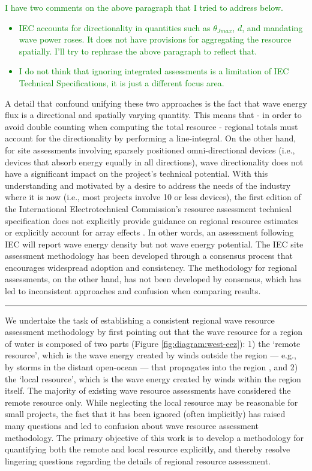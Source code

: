\textcolor{green}{I have two comments on the above paragraph that I tried to address below.
\begin{itemize}
    \item IEC accounts for directionality in quantities such as $\theta_{Jmax}$, $d$, and mandating wave power roses. It does not have provisions for aggregating the resource spatially. I'll try to rephrase the above paragraph to reflect that.
    \item I do not think that ignoring integrated assessments is a limitation of IEC Technical Specifications, it is just a different focus area. 
\end{itemize}}

A detail that confound unifying these two approaches is the fact that wave energy flux is a directional and spatially varying quantity. This means that - in order to avoid double counting when computing the total resource - regional totals must account for the directionality by performing a line-integral. On the other hand, for site assessments involving sparsely positioned omni-directional devices (i.e., devices that absorb energy equally in all directions), wave directionality does not have a significant impact on the project’s technical potential. With this understanding and motivated by a desire to address the needs of the industry where it is now (i.e., most projects involve 10 or less devices), the first edition of the International Electrotechnical Commission’s resource assessment technical specification does not explicitly provide guidance on regional resource estimates or explicitly account for array effects \citep[]{internationalelectrotechnicalcommissionPart101Wave2015}. In other words, an assessment following IEC will report wave energy density but not wave energy potential. The IEC site assessment methodology has been developed through a consensus process that encourages widespread adoption and consistency. The methodology for regional assessments, on the other hand, has not been developed by consensus, which has led to inconsistent approaches and confusion when comparing results.

\noindent\rule{12cm}{0.4pt}

We undertake the task of establishing a consistent regional wave
resource assessment methodology by first pointing out that the wave
resource for a region of water is composed of two parts (Figure
\ref{fig:diagram:west-eez}): 1) the ‘remote resource’, which is the
wave energy created by winds outside the region — e.g., by storms in
the distant open-ocean — that propagates into the region
\citep{gunnQuantifyingGlobalWave2012,
hemerRevisedAssessmentAustralia2017}, and 2) the ‘local resource’,
which is the wave energy created by winds within the region
itself. The majority of existing wave resource assessments have
considered the remote resource only. While neglecting the local
resource may be reasonable for small projects, the fact that it has
been ignored (often implicitly) has raised many questions and led to
confusion about wave resource assessment methodology. The primary
objective of this work is to develop a methodology for quantifying
both the remote and local resource explicitly, and thereby resolve
lingering questions regarding the details of regional resource
assessment.


